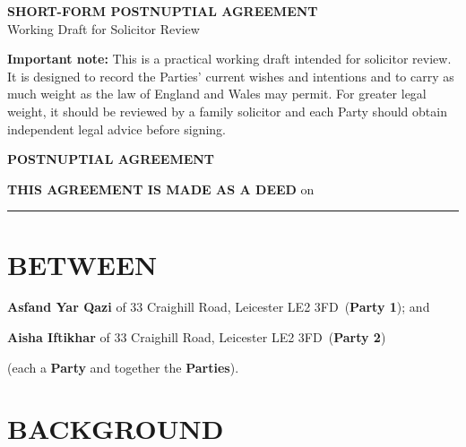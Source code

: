 \documentclass[10pt,a4paper]{article}
\newcommand{\PartyOne}{Asfand Yar Qazi}
\newcommand{\PartyTwo}{Aisha Iftikhar}
\newcommand{\CurrentHome}{33 Craighill Road, Leicester LE2 3FD}
\begin{document}
\begin{center}
    {\Large\bfseries SHORT-FORM POSTNUPTIAL AGREEMENT}\\[0.35em]
    {\normalsize Working Draft for Solicitor Review}
\end{center}

\vspace{0.6em}

\noindent\textbf{Important note:} This is a practical working draft intended for solicitor review. It is designed to record the Parties' current wishes and intentions and to carry as much weight as the law of England and Wales may permit. For greater legal weight, it should be reviewed by a family solicitor and each Party should obtain independent legal advice before signing.

\vspace{0.9em}

\begin{center}
    {\large\bfseries POSTNUPTIAL AGREEMENT}
\end{center}

\noindent\textbf{THIS AGREEMENT IS MADE AS A DEED} on \rule{7cm}{0.4pt}

\section*{BETWEEN}

\noindent\textbf{\PartyOne} of \CurrentHome\ (\textbf{Party 1}); and

\noindent\textbf{\PartyTwo} of \CurrentHome\ (\textbf{Party 2})

\noindent (each a \textbf{Party} and together the \textbf{Parties}).

\section*{BACKGROUND}
\end{document}

